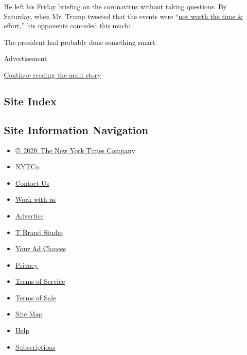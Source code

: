 He left his Friday briefing on the coronavirus without taking questions.
By Saturday, when Mr. Trump tweeted that the events were
``\href{https://www.nytimes3xbfgragh.onion/2020/04/25/us/coronavirus-news.html}{not
worth the time \& effort},'' his opponents conceded this much:

The president had probably done something smart.

Advertisement

\protect\hyperlink{after-bottom}{Continue reading the main story}

\hypertarget{site-index}{%
\subsection{Site Index}\label{site-index}}

\hypertarget{site-information-navigation}{%
\subsection{Site Information
Navigation}\label{site-information-navigation}}

\begin{itemize}
\tightlist
\item
  \href{https://help.nytimes3xbfgragh.onion/hc/en-us/articles/115014792127-Copyright-notice}{©~2020~The
  New York Times Company}
\end{itemize}

\begin{itemize}
\tightlist
\item
  \href{https://www.nytco.com/}{NYTCo}
\item
  \href{https://help.nytimes3xbfgragh.onion/hc/en-us/articles/115015385887-Contact-Us}{Contact
  Us}
\item
  \href{https://www.nytco.com/careers/}{Work with us}
\item
  \href{https://nytmediakit.com/}{Advertise}
\item
  \href{http://www.tbrandstudio.com/}{T Brand Studio}
\item
  \href{https://www.nytimes3xbfgragh.onion/privacy/cookie-policy\#how-do-i-manage-trackers}{Your
  Ad Choices}
\item
  \href{https://www.nytimes3xbfgragh.onion/privacy}{Privacy}
\item
  \href{https://help.nytimes3xbfgragh.onion/hc/en-us/articles/115014893428-Terms-of-service}{Terms
  of Service}
\item
  \href{https://help.nytimes3xbfgragh.onion/hc/en-us/articles/115014893968-Terms-of-sale}{Terms
  of Sale}
\item
  \href{https://spiderbites.nytimes3xbfgragh.onion}{Site Map}
\item
  \href{https://help.nytimes3xbfgragh.onion/hc/en-us}{Help}
\item
  \href{https://www.nytimes3xbfgragh.onion/subscription?campaignId=37WXW}{Subscriptions}
\end{itemize}
